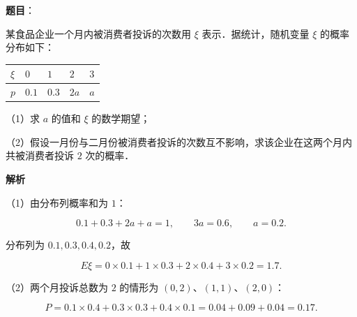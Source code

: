 \begin{answer}

\textbf{题目}：

某食品企业一个月内被消费者投诉的次数用 $\xi$ 表示．据统计，随机变量 $\xi$ 的概率分布如下：

\begin{center}
\begin{tabular}{lllll}
\toprule
$\xi$ & $0$ & $1$ & $2$ & $3$ \\
\midrule
$p$ & $0.1$ & $0.3$ & $2a$ & $a$ \\
\bottomrule
\end{tabular}
\end{center}

（1）求 $a$ 的值和 $\xi$ 的数学期望；

（2）假设一月份与二月份被消费者投诉的次数互不影响，求该企业在这两个月内共被消费者投诉 $2$ 次的概率．

\textbf{解析}

（1）由分布列概率和为 $1$：

\nopagebreak[4]
\[0.1+0.3+2a+a=1,\qquad 3a=0.6,\qquad a=0.2.\]

分布列为 $0.1,0.3,0.4,0.2$，故

\nopagebreak[4]
\[E\xi=0\times0.1+1\times0.3+2\times0.4+3\times0.2=1.7.\]

（2）两个月投诉总数为 $2$ 的情形为 $(0,2)$、$(1,1)$、$(2,0)$：

\nopagebreak[4]
\[P=0.1\times0.4+0.3\times0.3+0.4\times0.1
=0.04+0.09+0.04=0.17.\]


\end{answer}
